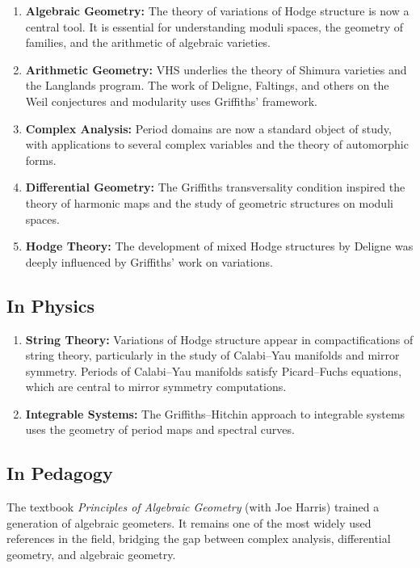 \begin{enumerate}
    \item \textbf{Algebraic Geometry:} The theory of variations of Hodge structure is now a central tool. It is essential for understanding moduli spaces, the geometry of families, and the arithmetic of algebraic varieties.
    \item \textbf{Arithmetic Geometry:} VHS underlies the theory of Shimura varieties and the Langlands program. The work of Deligne, Faltings, and others on the Weil conjectures and modularity uses Griffiths' framework.
    \item \textbf{Complex Analysis:} Period domains are now a standard object of study, with applications to several complex variables and the theory of automorphic forms.
    \item \textbf{Differential Geometry:} The Griffiths transversality condition inspired the theory of harmonic maps and the study of geometric structures on moduli spaces.
    \item \textbf{Hodge Theory:} The development of mixed Hodge structures by Deligne was deeply influenced by Griffiths' work on variations.
\end{enumerate}

\subsection{In Physics}

\begin{enumerate}
    \item \textbf{String Theory:} Variations of Hodge structure appear in compactifications of string theory, particularly in the study of Calabi--Yau manifolds and mirror symmetry. Periods of Calabi--Yau manifolds satisfy Picard--Fuchs equations, which are central to mirror symmetry computations.
    \item \textbf{Integrable Systems:} The Griffiths--Hitchin approach to integrable systems uses the geometry of period maps and spectral curves.
\end{enumerate}

\subsection{In Pedagogy}

The textbook \textit{Principles of Algebraic Geometry} (with Joe Harris) trained a generation of algebraic geometers. It remains one of the most widely used references in the field, bridging the gap between complex analysis, differential geometry, and algebraic geometry.

